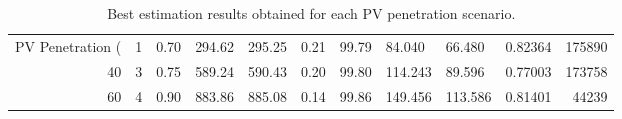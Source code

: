 \begin{table}
\caption{Best estimation results obtained for each PV penetration scenario.}
\label{tab:best_results}
\begin{tabular}{rrllllllllr}
\toprule
PV Penetration (%
\midrule
20 & 1 & 0.70 & 294.62 & 295.25 & 0.21 & 99.79 & 84.040 & 66.480 & 0.82364 & 175890 \\
40 & 3 & 0.75 & 589.24 & 590.43 & 0.20 & 99.80 & 114.243 & 89.596 & 0.77003 & 173758 \\
60 & 4 & 0.90 & 883.86 & 885.08 & 0.14 & 99.86 & 149.456 & 113.586 & 0.81401 & 44239 \\
\bottomrule
\end{tabular}
\end{table}
